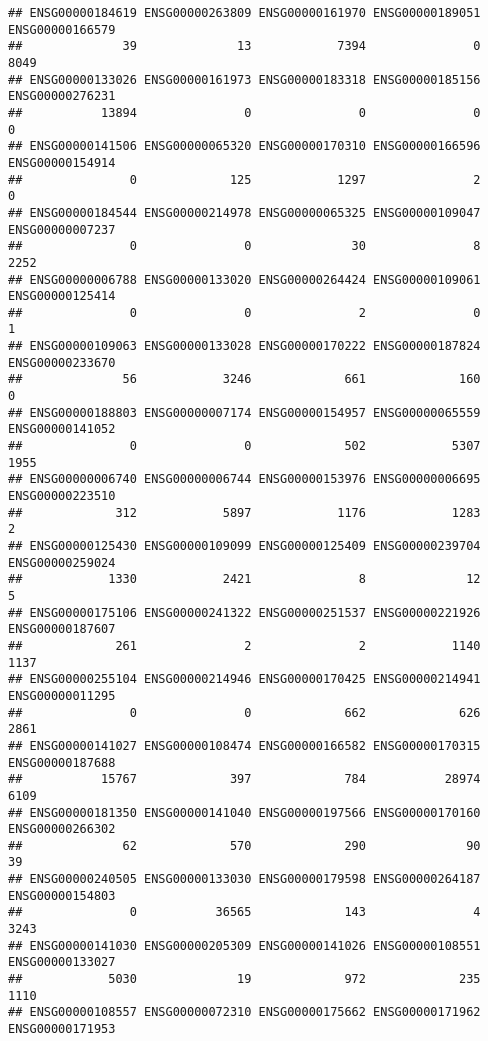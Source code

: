 \documentclass[
]{article}
\begin{document}
\begin{verbatim}
## ENSG00000184619 ENSG00000263809 ENSG00000161970 ENSG00000189051 ENSG00000166579 
##              39              13            7394               0            8049 
## ENSG00000133026 ENSG00000161973 ENSG00000183318 ENSG00000185156 ENSG00000276231 
##           13894               0               0               0               0 
## ENSG00000141506 ENSG00000065320 ENSG00000170310 ENSG00000166596 ENSG00000154914 
##               0             125            1297               2               0 
## ENSG00000184544 ENSG00000214978 ENSG00000065325 ENSG00000109047 ENSG00000007237 
##               0               0              30               8            2252 
## ENSG00000006788 ENSG00000133020 ENSG00000264424 ENSG00000109061 ENSG00000125414 
##               0               0               2               0               1 
## ENSG00000109063 ENSG00000133028 ENSG00000170222 ENSG00000187824 ENSG00000233670 
##              56            3246             661             160               0 
## ENSG00000188803 ENSG00000007174 ENSG00000154957 ENSG00000065559 ENSG00000141052 
##               0               0             502            5307            1955 
## ENSG00000006740 ENSG00000006744 ENSG00000153976 ENSG00000006695 ENSG00000223510 
##             312            5897            1176            1283               2 
## ENSG00000125430 ENSG00000109099 ENSG00000125409 ENSG00000239704 ENSG00000259024 
##            1330            2421               8              12               5 
## ENSG00000175106 ENSG00000241322 ENSG00000251537 ENSG00000221926 ENSG00000187607 
##             261               2               2            1140            1137 
## ENSG00000255104 ENSG00000214946 ENSG00000170425 ENSG00000214941 ENSG00000011295 
##               0               0             662             626            2861 
## ENSG00000141027 ENSG00000108474 ENSG00000166582 ENSG00000170315 ENSG00000187688 
##           15767             397             784           28974            6109 
## ENSG00000181350 ENSG00000141040 ENSG00000197566 ENSG00000170160 ENSG00000266302 
##              62             570             290              90              39 
## ENSG00000240505 ENSG00000133030 ENSG00000179598 ENSG00000264187 ENSG00000154803 
##               0           36565             143               4            3243 
## ENSG00000141030 ENSG00000205309 ENSG00000141026 ENSG00000108551 ENSG00000133027 
##            5030              19             972             235            1110 
## ENSG00000108557 ENSG00000072310 ENSG00000175662 ENSG00000171962 ENSG00000171953 

\end{verbatim}
\end{document}
